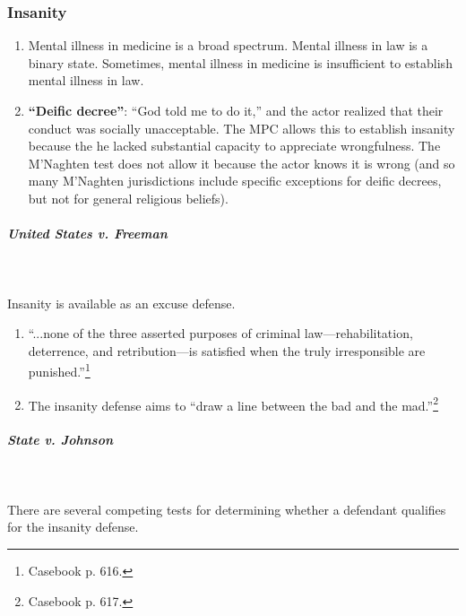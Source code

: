 \subsubsection{Insanity}

\begin{enumerate}
    \item Mental illness in medicine is a broad spectrum. Mental illness in 
    law is a binary state. Sometimes, mental illness in medicine is 
    insufficient to establish mental illness in law.
    \item \textbf{``Deific decree''}: ``God told me to do it,'' and the actor 
    realized that their conduct was socially unacceptable. The MPC allows 
    this to establish insanity because the he lacked substantial capacity to 
    appreciate wrongfulness. The M'Naghten test does not allow it because the 
    actor knows it is wrong (and so many M'Naghten jurisdictions include 
    specific exceptions for deific decrees, but not for general religious 
    beliefs).
\end{enumerate}

\paragraph{\emph{United States v. Freeman}}
~\\\\
Insanity is available as an excuse defense.

\begin{enumerate}
    \item ``...none of the three asserted purposes of criminal 
    law---rehabilitation, deterrence, and retribution---is satisfied when the 
    truly irresponsible are punished.''\footnote{Casebook p. 616.}
    \item The insanity defense aims to ``draw a line between the bad and the 
    mad.''\footnote{Casebook p. 617.}
\end{enumerate}

\paragraph{\emph{State v. Johnson}}
~\\\\
There are several competing tests for determining whether a defendant 
qualifies for the insanity defense.

